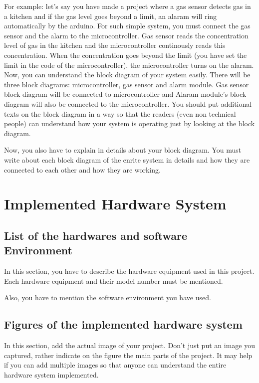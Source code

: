 \documentclass[conference]{IEEEtran}
\begin{document}
\noindent For example: let's say you have made a project where a gas sensor detects gas in a kitchen and if the gas level goes beyond a limit, an alaram will ring automatically by the arduino. For such simple system, you must connect the gas sensor and the alarm to the microcontroller. Gas sensor reads the concentration level of gas in the kitchen and the microcontroller continously reads this concentration. When the concentration goes beyond the limit (you have set the limit in the code of the microcontroller), the microcontroller turns on the alaram. Now, you can understand the block diagram of your system easily. There will be three block diagrams: microcontroller, gas sensor and alarm module. Gas sensor block diagram will be connected to microcontroller and Alaram module's block diagram will also be connected to the microcontroller. You should put additional texts on the block diagram in a way so that the readers (even non technical people) can understand how your system is operating just by looking at the block diagram.

\noindent Now, you also have to explain in details about your block diagram. You must write about each block diagram of the enrite system in details and how they are connected to each other and how they are working.



\section{Implemented Hardware System }
\subsection{List of the hardwares and software Environment}

In this section, you have to describe the hardware equipment used in this project. Each hardware equipment and their model number must be mentioned.

\noindent Also, you have to mention the software environment you have used.

\subsection{Figures of the implemented hardware system}\label{AA}
In this section, add the actual image of your project. Don't just put an image you captured, rather indicate on the figure the main parts of the project. It may help if you can add multiple images so that anyone can understand the entire hardware system implemented.
\end{document}
